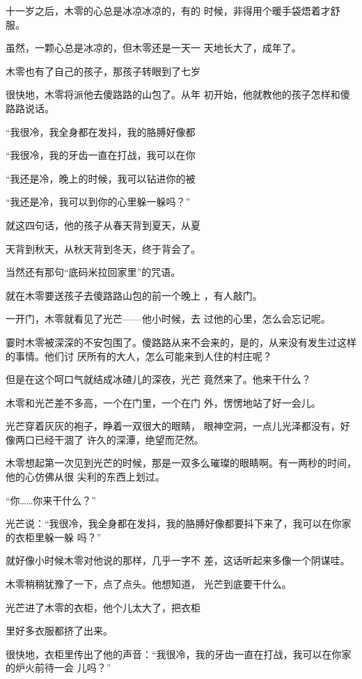 \documentclass{article}
\begin{document}
十一岁之后，木零的心总是冰凉冰凉的，有的
时候，非得用个暖手袋焐着才舒服。 

虽然，一颗心总是冰凉的，但木零还是一天一
天地长大了，成年了。 

木零也有了自己的孩子，那孩子转眼到了七岁

很快地，木零将派他去傻路路的山包了。从年
初开始，他就教他的孩子怎样和傻路路说话。 

“我很冷，我全身都在发抖，我的胳膊好像都

“我很冷，我的牙齿一直在打战，我可以在你

“我还是冷，晚上的时候，我可以钻进你的被

“我还是冷，我可以到你的心里躲一躲吗？”

就这四句话，他的孩子从春天背到夏天，从夏
\newpage

天背到秋天，从秋天背到冬天，终于背会了。 


当然还有那句“底码米拉回家里”的咒语。 

就在木零要送孩子去傻路路山包的前一个晚上
，有人敲门。 

一开门，木零就看见了光芒——他小时候，去
过他的心里，怎么会忘记呢。 

霎时木零被深深的不安包围了。傻路路从来不会来的，是的，从来没有发生过这样的事情。他们讨
厌所有的大人，怎么可能来到人住的村庄呢？ 

但是在这个呵口气就结成冰碴儿的深夜，光芒
竟然来了。他来干什么？ 

木零和光芒差不多高，一个在门里，一个在门
外，愣愣地站了好一会儿。 

光芒穿着灰灰的袍子，睁着一双很大的眼睛，
\newpage
眼神空洞，一点儿光泽都没有，好像两口已经干涸了
许久的深潭，绝望而茫然。 

木零想起第一次见到光芒的时候，那是一双多么璀璨的眼睛啊。有一两秒的时间，他的心仿佛从很
尖利的东西上划过。 


“你……你来干什么？” 

光芒说：“我很冷，我全身都在发抖，我的胳膊好像都要抖下来了，我可以在你家的衣柜里躲一躲
吗？” 

就好像小时候木零对他说的那样，几乎一字不
差，这话听起来多像一个阴谋哇。 

木零稍稍犹豫了一下，点了点头。他想知道，
光芒到底要干什么。 

光芒进了木零的衣柜，他个儿太大了，把衣柜

\newpage
里好多衣服都挤了出来。 

很快地，衣柜里传出了他的声音：“我很冷，我的牙齿一直在打战，我可以在你家的炉火前待一会
儿吗？” 
\end{document}
